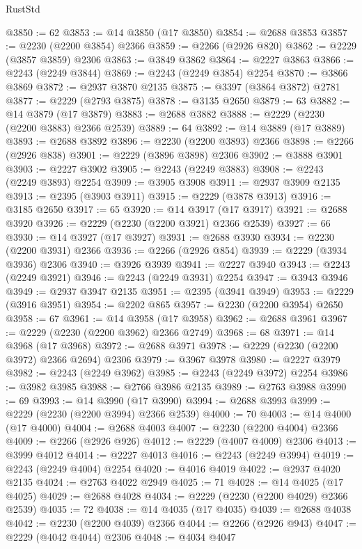 \begin{lexlean}{RustStd}
\begin{coremodule}
@3850 := 62
@3853 := @14 @3850 (@17 @3850)
@3854 := @2688 @3853
@3857 := @2230 (@2200 @3854) @2366
@3859 := @2266 (@2926 @820)
@3862 := @2229 (@3857 @3859) @2306
@3863 := @3849 @3862
@3864 := @2227 @3863
@3866 := @2243 (@2249 @3844)
@3869 := @2243 (@2249 @3854) @2254
@3870 := @3866 @3869
@3872 := @2937 @3870 @2135
@3875 := @3397 (@3864 @3872) @2781
@3877 := @2229 (@2793 @3875)
@3878 := @3135 @2650
@3879 := 63
@3882 := @14 @3879 (@17 @3879)
@3883 := @2688 @3882
@3888 := @2229 (@2230 (@2200 @3883) @2366 @2539)
@3889 := 64
@3892 := @14 @3889 (@17 @3889)
@3893 := @2688 @3892
@3896 := @2230 (@2200 @3893) @2366
@3898 := @2266 (@2926 @838)
@3901 := @2229 (@3896 @3898) @2306
@3902 := @3888 @3901
@3903 := @2227 @3902
@3905 := @2243 (@2249 @3883)
@3908 := @2243 (@2249 @3893) @2254
@3909 := @3905 @3908
@3911 := @2937 @3909 @2135
@3913 := @2395 (@3903 @3911)
@3915 := @2229 (@3878 @3913)
@3916 := @3185 @2650
@3917 := 65
@3920 := @14 @3917 (@17 @3917)
@3921 := @2688 @3920
@3926 := @2229 (@2230 (@2200 @3921) @2366 @2539)
@3927 := 66
@3930 := @14 @3927 (@17 @3927)
@3931 := @2688 @3930
@3934 := @2230 (@2200 @3931) @2366
@3936 := @2266 (@2926 @854)
@3939 := @2229 (@3934 @3936) @2306
@3940 := @3926 @3939
@3941 := @2227 @3940
@3943 := @2243 (@2249 @3921)
@3946 := @2243 (@2249 @3931) @2254
@3947 := @3943 @3946
@3949 := @2937 @3947 @2135
@3951 := @2395 (@3941 @3949)
@3953 := @2229 (@3916 @3951)
@3954 := @2202 @865
@3957 := @2230 (@2200 @3954) @2650
@3958 := 67
@3961 := @14 @3958 (@17 @3958)
@3962 := @2688 @3961
@3967 := @2229 (@2230 (@2200 @3962) @2366 @2749)
@3968 := 68
@3971 := @14 @3968 (@17 @3968)
@3972 := @2688 @3971
@3978 := @2229 (@2230 (@2200 @3972) @2366 @2694) @2306
@3979 := @3967 @3978
@3980 := @2227 @3979
@3982 := @2243 (@2249 @3962)
@3985 := @2243 (@2249 @3972) @2254
@3986 := @3982 @3985
@3988 := @2766 @3986 @2135
@3989 := @2763 @3988
@3990 := 69
@3993 := @14 @3990 (@17 @3990)
@3994 := @2688 @3993
@3999 := @2229 (@2230 (@2200 @3994) @2366 @2539)
@4000 := 70
@4003 := @14 @4000 (@17 @4000)
@4004 := @2688 @4003
@4007 := @2230 (@2200 @4004) @2366
@4009 := @2266 (@2926 @926)
@4012 := @2229 (@4007 @4009) @2306
@4013 := @3999 @4012
@4014 := @2227 @4013
@4016 := @2243 (@2249 @3994)
@4019 := @2243 (@2249 @4004) @2254
@4020 := @4016 @4019
@4022 := @2937 @4020 @2135
@4024 := @2763 @4022 @2949
@4025 := 71
@4028 := @14 @4025 (@17 @4025)
@4029 := @2688 @4028
@4034 := @2229 (@2230 (@2200 @4029) @2366 @2539)
@4035 := 72
@4038 := @14 @4035 (@17 @4035)
@4039 := @2688 @4038
@4042 := @2230 (@2200 @4039) @2366
@4044 := @2266 (@2926 @943)
@4047 := @2229 (@4042 @4044) @2306
@4048 := @4034 @4047

\end{coremodule}
\end{lexlean}
